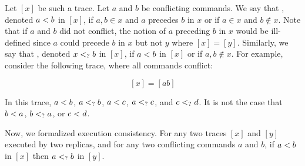 Let $[x]$ be such a trace. Let $a$ and $b$ be conflicting commands. We say that
, denoted $a < b$ in
$[x]$, if $a, b \in x$ and $a$ precedes $b$ in $x$ or if $a \in x$ and $b
\notin x$.  Note that if $a$ and $b$ did not conflict, the notion of $a$
preceding $b$ in $x$ would be ill-defined since $a$ could precede $b$ in $x$
but not $y$ where $[x] = [y]$. Similarly, we say that , denoted $x <_? b$ in $[x]$, if $a
< b$ in $[x]$ or if $a, b \notin x$. For example, consider the
following trace, where all commands conflict:

\[
  [x] = [ab]
\]

In this trace, $a < b$, $a <_? b$, $a
< c$, $a <_? c$, and $c <_? d$. It
is not the case that $b < a$, $b <_? a$, or $c
< d$.

Now, we formalized execution consistency. For any two traces $[x]$ and $[y]$
executed by two replicas, and for any two conflicting commands $a$ and $b$, if
$a < b$ in $[x]$ then $a <_? b$ in $[y]$.

